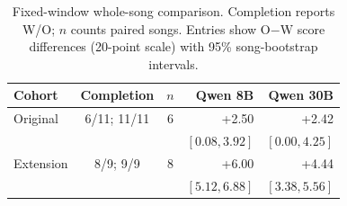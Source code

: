 \begin{table}[t]
\centering
\caption{Fixed-window whole-song comparison. Completion reports W/O; $n$ counts paired songs. Entries show O$-$W score differences (20-point scale) with 95\% song-bootstrap intervals.}
\label{tab:harness-preliminary}
\begingroup\footnotesize
\setlength{\tabcolsep}{2pt}
\renewcommand{\arraystretch}{1.12}
\begin{tabular*}{\columnwidth}{@{\extracolsep{\fill}}lccrr@{}}
\toprule
Cohort & Completion & $n$ & Qwen 8B & Qwen 30B \\
\midrule
Original & 6/11; 11/11 & 6 & +2.50 & +2.42 \\
 & & & $[0.08,3.92]$ & $[0.00,4.25]$ \\
Extension & 8/9; 9/9 & 8 & +6.00 & +4.44 \\
 & & & $[5.12,6.88]$ & $[3.38,5.56]$ \\
\bottomrule
\end{tabular*}
\endgroup
\end{table}
